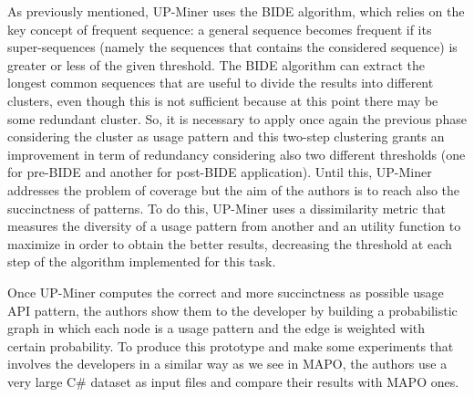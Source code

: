 As previously mentioned, UP-Miner uses the BIDE algorithm, which relies on the 
key concept of frequent sequence: a general sequence becomes frequent if its 
super-sequences (namely the sequences that contains the considered sequence) is 
greater or less of the given threshold. The BIDE algorithm can extract the 
longest common sequences that are useful to divide the results into different 
clusters, even though this is not sufficient because at this point there may be 
some redundant cluster. So, it is necessary to apply once again the previous 
phase considering the cluster as usage pattern and this two-step clustering 
grants an improvement in term of redundancy considering also two different 
thresholds (one for pre-BIDE and another for post-BIDE application). Until 
this, UP-Miner addresses the problem of coverage but the aim of the authors is 
to reach also the succinctness of patterns. To do this, UP-Miner uses a 
dissimilarity metric that measures the diversity of a usage pattern from 
another and an utility function to maximize in order to obtain the better 
results, decreasing the threshold at each step of the algorithm implemented for 
this task.

Once UP-Miner computes the correct and more succinctness as possible usage API pattern, the authors show them to the developer by building a probabilistic graph in which each node is a usage pattern and the edge is weighted with certain probability. To produce this prototype and make some experiments that involves the developers in a similar way as we see in MAPO, the authors use a very large C\# dataset as input files and compare their results with MAPO ones.

 


